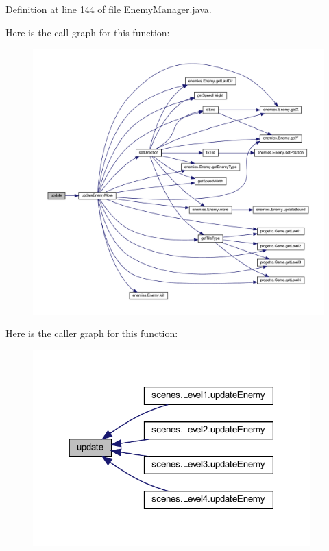 Definition at line 144 of file Enemy\+Manager.\+java.

Here is the call graph for this function\+:
\nopagebreak
\begin{figure}[H]
\begin{center}
\leavevmode
\includegraphics[width=350pt]{classmanagers_1_1_enemy_manager_ac5c54df7ed3b930268c8d7752c101725_cgraph}
\end{center}
\end{figure}
Here is the caller graph for this function\+:\nopagebreak
\begin{figure}[H]
\begin{center}
\leavevmode
\includegraphics[width=303pt]{classmanagers_1_1_enemy_manager_ac5c54df7ed3b930268c8d7752c101725_icgraph}
\end{center}
\end{figure}
\mbox{\label{classmanagers_1_1_enemy_manager_a5c2bac0f4b9a3ef4e30f60d4b0c3b951}} 

